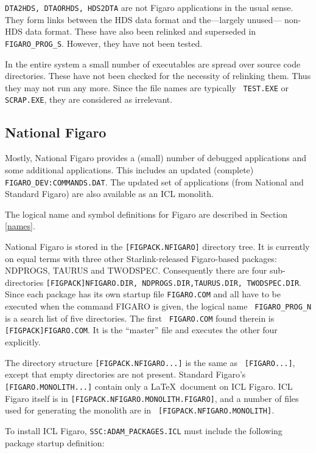 {\tt DTA2HDS, DTAORHDS, HDS2DTA} are not Figaro applications in the usual
sense. They form links between the HDS data format and the---largely unused---
non-HDS data format. These have also been relinked and superseded in {\tt
FIGARO\_\-PROG\_S}. However, they have not been tested.

In the entire system a small number of executables are spread over source code
directories. These have not been checked for the necessity of relinking them.
Thus they may not run any more. Since the file names are typically {\tt
TEST.EXE} or {\tt SCRAP.EXE}, they are considered as irrelevant.

\subsection{National Figaro}
\label{natfig}

Mostly, National Figaro provides a (small) number of debugged applications and
some additional applications. This includes an updated (complete) {\tt
FIGARO\_DEV:COMMANDS.DAT}. The updated set of applications (from National and
Standard Figaro) are also available as an ICL monolith.

The logical name and symbol definitions for Figaro are described in Section
\ref{names}.

National Figaro is stored in the {\tt [FIGPACK.\-NFIGARO]} directory tree. It
is currently on equal terms with three other Starlink-released Figaro-based
packages: NDPROGS, TAURUS and TWODSPEC. Consequently there are four
sub-directories {\tt [FIGPACK]\-NFIGARO.DIR, NDPROGS.DIR,\linebreak TAURUS.DIR,
TWODSPEC.DIR}. Since each package has its own startup file {\tt FIGARO.COM} and
all have to be executed when the command FIGARO is given, the logical name {\tt
FIGARO\_\-PROG\_N} is a search list of five directories. The first {\tt
FIGARO.COM} found therein is {\tt [FIGPACK]\-FIGARO.COM}. It is the ``master''
file and executes the other four explicitly.

The directory structure {\tt [FIGPACK.NFIGARO...]} is the same as {\tt
[FIGARO...]}, except that empty directories are not present. Standard Figaro's
{\tt [FIGARO.MONOLITH...]} contain only a \LaTeX\ document on ICL Figaro. ICL
Figaro itself is in {\tt [FIGPACK.\-NFIGARO.\-MONOLITH.\-FIGARO]}, and a number
of files used for generating the monolith are in {\tt
[FIGPACK.\-NFIGARO.\-MONOLITH]}.

To install ICL Figaro, {\tt SSC:ADAM\_PACKAGES.ICL} must include the following
package startup definition:

